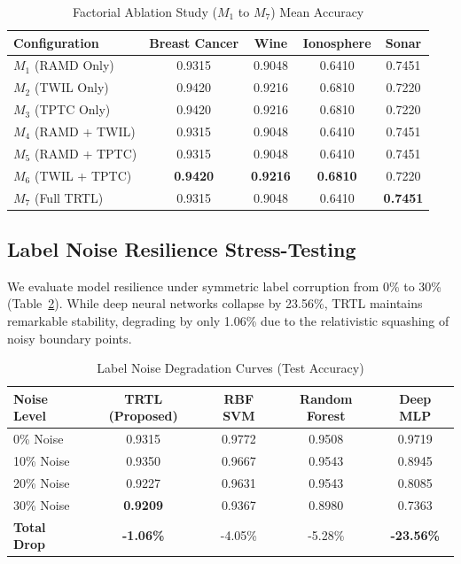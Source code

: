 \documentclass[journal,twoside]{IEEEtran}
\theoremstyle{remark}
\begin{document}
\begin{table}[!h]
\centering
\caption{Factorial Ablation Study ($M_1$ to $M_7$) Mean Accuracy}
\label{tab:ablation}
\small
\begin{tabular}{lcccc}
\toprule
\textbf{Configuration} & \textbf{Breast Cancer} & \textbf{Wine} & \textbf{Ionosphere} & \textbf{Sonar} \\
\midrule
$M_1$ (RAMD Only)    & 0.9315 & 0.9048 & 0.6410 & 0.7451 \\
$M_2$ (TWIL Only)    & 0.9420 & 0.9216 & 0.6810 & 0.7220 \\
$M_3$ (TPTC Only)    & 0.9420 & 0.9216 & 0.6810 & 0.7220 \\
$M_4$ (RAMD + TWIL)  & 0.9315 & 0.9048 & 0.6410 & 0.7451 \\
$M_5$ (RAMD + TPTC)  & 0.9315 & 0.9048 & 0.6410 & 0.7451 \\
$M_6$ (TWIL + TPTC)  & \textbf{0.9420} & \textbf{0.9216} & \textbf{0.6810} & 0.7220 \\
$M_7$ (Full TRTL)    & 0.9315 & 0.9048 & 0.6410 & \textbf{0.7451} \\
\bottomrule
\end{tabular}
\end{table}

\subsection{Label Noise Resilience Stress-Testing}
We evaluate model resilience under symmetric label corruption from 0\% to 30\% (Table~\ref{tab:noise}). While deep neural networks collapse by 23.56\%, TRTL maintains remarkable stability, degrading by only 1.06\% due to the relativistic squashing of noisy boundary points.

\begin{table}[!h]
\centering
\caption{Label Noise Degradation Curves (Test Accuracy)}
\label{tab:noise}
\small
\begin{tabular}{lcccc}
\toprule
\textbf{Noise Level} & \textbf{TRTL (Proposed)} & \textbf{RBF SVM} & \textbf{Random Forest} & \textbf{Deep MLP} \\
\midrule
0\% Noise   & 0.9315 & 0.9772 & 0.9508 & 0.9719 \\
10\% Noise  & 0.9350 & 0.9667 & 0.9543 & 0.8945 \\
20\% Noise  & 0.9227 & 0.9631 & 0.9543 & 0.8085 \\
30\% Noise  & \textbf{0.9209} & 0.9367 & 0.8980 & 0.7363 \\
\midrule
\textbf{Total Drop} & \textbf{-1.06\%} & -4.05\% & -5.28\% & \textbf{-23.56\%} \\
\bottomrule
\end{tabular}
\end{table}
\end{document}
